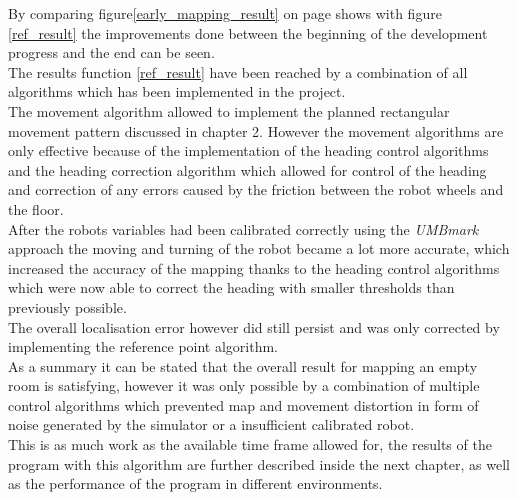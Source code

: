 By comparing figure\ref{early_mapping_result} on page \pageref{early_mapping_result} shows with figure \ref{ref_result} the improvements done between the beginning of the development progress and the end can be seen. \\[3ex]

The results function \ref{ref_result} have been reached by a combination of all algorithms which has been implemented in the project.\\
The movement algorithm allowed to implement the planned rectangular movement pattern discussed in chapter 2. However the movement algorithms are only effective because of the implementation of the heading control algorithms and the heading correction algorithm which allowed for control of the heading and correction of any errors caused by the friction between the robot wheels and the floor. \\
After the robots variables had been calibrated correctly using the \textit{UMBmark} approach the moving and turning of the robot became a lot more accurate, which increased the accuracy of the mapping thanks to the heading control algorithms which were now able to correct the heading with smaller thresholds than previously possible.\\
The overall localisation error however did still persist and was only corrected by implementing the reference point algorithm.\\
As a summary it can be stated that the overall result for mapping an empty room is satisfying, however it was only possible by a combination of multiple control algorithms which prevented map and movement distortion in form of noise generated by the simulator or a insufficient calibrated robot.\\[3ex]
This is as much work as the available time frame allowed for, the results of the program with this algorithm are further described inside the next chapter, as well as the performance of the program in different environments.